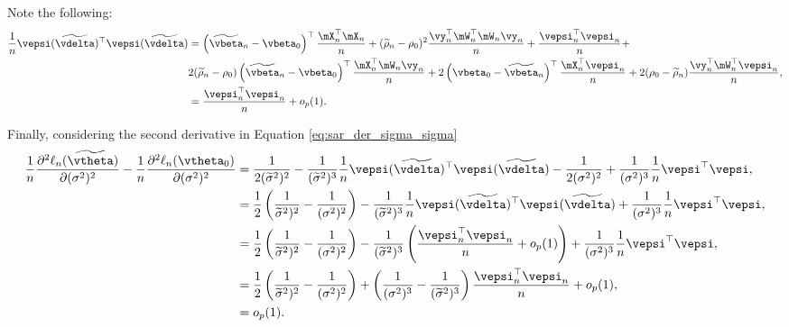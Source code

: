 \documentclass[english,12pt]{book}\usepackage[]{graphicx}\usepackage[]{xcolor}
\begin{document}
\begin{subappendices}
\begin{enumerate}
Note the following:
   \begin{equation*}
    \begin{aligned}
    \frac{1}{n}\vepsi(\widetilde{\vdelta})^\top \vepsi(\widetilde{\vdelta}) & = \left(\widetilde{\vbeta}_n - \vbeta_0\right)^\top\frac{\mX_n^\top\mX_n}{n} + (\widetilde{\rho}_n -\rho_0)^2\frac{\vy_n^\top\mW_n^\top\mW_n\vy_n}{n} + \frac{\vepsi_n^{\top}\vepsi_n}{n} + \\
    & 2(\widetilde{\rho}_n -\rho_0)\left(\widetilde{\vbeta}_n - \vbeta_0\right)^\top\frac{\mX_n^\top\mW_n\vy_n}{n} + 2\left(\vbeta_0-\widetilde{\vbeta}_n\right)^\top\frac{\mX_n^\top\vepsi_n}{n} + 2(\rho_0-\widetilde{\rho}_n)\frac{\vy_n^\top\mW_n^\top\vepsi_n}{n}, \\
    & = \frac{\vepsi_n^{\top}\vepsi_n}{n} + o_p(1).
    \end{aligned}
   \end{equation*}
   
   
Finally, considering the second derivative in Equation \eqref{eq:sar_der_sigma_sigma}
   \begin{equation*}
    \begin{aligned}
      \frac{1}{n}\frac{\partial^2 \ell_n(\widetilde{\vtheta})}{\partial (\sigma^2)^2} -	\frac{1}{n}\frac{\partial^2 \ell_n(\vtheta_0)}{\partial (\sigma^2)^2}  & = \frac{1}{2(\widetilde{\sigma}^2) ^2} - \frac{1}{(\widetilde{\sigma}^2)^3} \frac{1}{n}\vepsi(\widetilde{\vdelta})^\top \vepsi(\widetilde{\vdelta}) -\frac{1}{2(\sigma^2) ^2} + \frac{1}{(\sigma^2)^3} \frac{1}{n}\vepsi^\top \vepsi, \\
      & = \frac{1}{2}\left(\frac{1}{\widetilde{\sigma}^2) ^2}-\frac{1}{(\sigma^2) ^2}\right)- \frac{1}{(\widetilde{\sigma}^2)^3} \frac{1}{n}\vepsi(\widetilde{\vdelta})^\top \vepsi(\widetilde{\vdelta}) + \frac{1}{(\sigma^2)^3} \frac{1}{n}\vepsi^\top \vepsi, \\
      & = \frac{1}{2}\left(\frac{1}{\widetilde{\sigma}^2) ^2}-\frac{1}{(\sigma^2) ^2}\right)- \frac{1}{(\widetilde{\sigma}^2)^3} \left(\frac{\vepsi_n^{\top}\vepsi_n}{n} + o_p(1)\right)+ \frac{1}{(\sigma^2)^3} \frac{1}{n}\vepsi^\top \vepsi, \\
      & = \frac{1}{2}\left(\frac{1}{\widetilde{\sigma}^2) ^2}-\frac{1}{(\sigma^2) ^2}\right)+ \left(\frac{1}{(\sigma^2)^3} -\frac{1}{(\widetilde{\sigma}^2)^3}\right)\frac{\vepsi_n^{\top}\vepsi_n}{n} + o_p(1), \\
      & = o_p(1).
    \end{aligned}
   \end{equation*}
   

\end{enumerate}
\end{subappendices}
\end{document}
